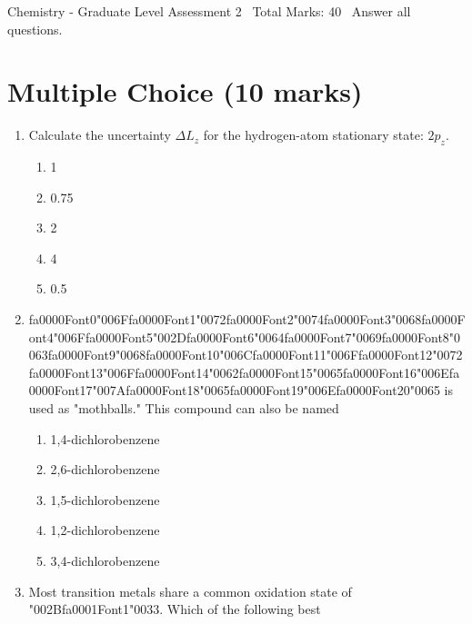 \documentclass[12pt]{article}
\begin{document}
\begin{center}
Chemistry - Graduate Level Assessment 2 \
Total Marks: 40 \
Answer all questions.
\end{center}

\section*{Multiple Choice (10 marks)}
\begin{enumerate}[label=\arabic*.]
\item Calculate the uncertainty $\Delta L_z$ for the hydrogen-atom stationary state: $2 p_z$.
\begin{enumerate}[label=(\alph*)]
    \item 1
    \item 0.75
    \item 2
    \item 4
    \item 0.5
\end{enumerate}
\item {\csname fa0000Font0\endcsname\char"006F}{\csname fa0000Font1\endcsname\char"0072}{\csname fa0000Font2\endcsname\char"0074}{\csname fa0000Font3\endcsname\char"0068}{\csname fa0000Font4\endcsname\char"006F}{\csname fa0000Font5\endcsname\char"002D}{\csname fa0000Font6\endcsname\char"0064}{\csname fa0000Font7\endcsname\char"0069}{\csname fa0000Font8\endcsname\char"0063}{\csname fa0000Font9\endcsname\char"0068}{\csname fa0000Font10\endcsname\char"006C}{\csname fa0000Font11\endcsname\char"006F}{\csname fa0000Font12\endcsname\char"0072}{\csname fa0000Font13\endcsname\char"006F}{\csname fa0000Font14\endcsname\char"0062}{\csname fa0000Font15\endcsname\char"0065}{\csname fa0000Font16\endcsname\char"006E}{\csname fa0000Font17\endcsname\char"007A}{\csname fa0000Font18\endcsname\char"0065}{\csname fa0000Font19\endcsname\char"006E}{\csname fa0000Font20\endcsname\char"0065} is used as "mothballs." This compound can also be named
\begin{enumerate}[label=(\alph*)]
    \item 1,4-dichlorobenzene
    \item 2,6-dichlorobenzene
    \item 1,5-dichlorobenzene
    \item 1,2-dichlorobenzene
    \item 3,4-dichlorobenzene
\end{enumerate}
\item Most transition metals share a common oxidation state of {\char"002B}{\csname fa0001Font1\endcsname\char"0033}. Which of the following best

\end{enumerate}
\end{document}
